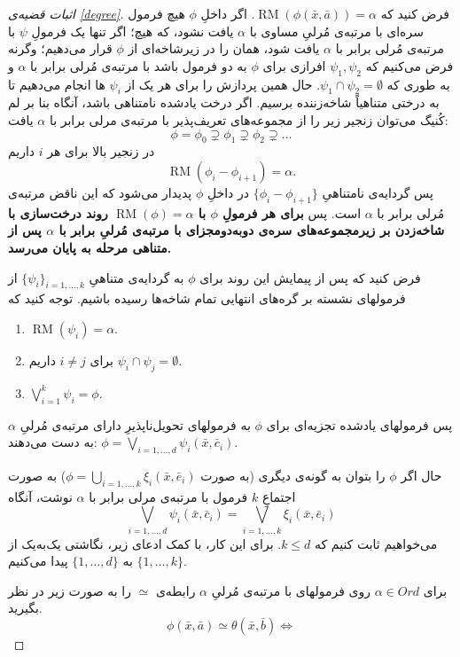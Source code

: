 \documentclass[12pt,a4paper]{report}
\theoremstyle{colorhead}
\DeclareMathOperator{\RM}{RM}
\begin{document}
\begin{proof}[اثبات قضیه‌ی 
\ref{degree}]
	فرض کنید که 
$\RM(\phi(\bar{x},\bar{a}))=\alpha$.
اگر داخلِ
$\phi$
هیچ فرمول سره‌ای با مرتبه‌ی مُرلیِ مساوی با 
$\alpha$
یافت نشود، که هیچ؛ 
اگر تنها یک فرمولِ
$\psi$
با مرتبه‌ی مُرلی برابر با 
$\alpha$
یافت شود، همان را در زیرشاخه‌ای از
$\phi$
قرار می‌دهیم؛ 
وگرنه فرض می‌کنیم که 
$\psi_1,\psi_2$
افرازی برای
$\phi$
به دو فرمول باشد با مرتبه‌ی مُرلی برابر با 
$\alpha$
و به طوری که 
$\psi_1\cap \psi_2=\emptyset$.
حال همین پردازش را برای هر یک از
$\psi_i$
ها انجام می‌دهیم تا به درختی متناهیاً شاخه‌زننده برسیم. اگر درخت یادشده نامتناهی باشد، آنگاه بنا بر
لم کُنیگ می‌توان زنجیر زیر را از مجموعه‌های تعریف‌پذیر با مرتبه‌ی مرلی برابر با
$\alpha$
یافت:
\[
\phi=\phi_0\supsetneq\phi_1\supsetneq  \phi_2\supsetneq\ldots
\]
در زنجیر بالا برای هر $i$
داریم
\[
\RM(\phi_i-\phi_{i+1})=\alpha.
\]
پس گردایه‌ی نامتناهیِ
$\{\phi_i-\phi_{i+1}\}$
در داخلِ
$\phi$
پدیدار می‌شود که این ناقض مرتبه‌ی مُرلی برابر با 
$\alpha$
است. 
پس 
\textbf{برای هر فرمولِ 
$\phi$
با 
$\RM(\phi)=\alpha$
روند درخت‌سازی با شاخه‌زدن بر زیرمجموعه‌های سره‌ی دوبه‌دومجزای با مرتبه‌ی مُرلیِ برابر با
$\alpha$
پس از متناهی مرحله به پایان می‌رسد. 
}
\par 
فرض کنید که 
پس از پیمایش این روند برای 
$\phi$
به گردایه‌ی متناهیِ
$\{\psi_i\}_{i=1,\ldots,k}$
از فرمولهای نشسته بر گره‌های انتهایی تمام شاخه‌ها رسیده باشیم. 
توجه کنید که 
\begin{enumerate}
	\item 
	$\RM(\psi_i)=\alpha$.
	\item 
	برای
	$i\not=j$
	داریم
	$\psi_i\cap \psi_j=\emptyset$.
	\item 
	$\bigvee_{i=1}^k \psi_i=\phi$.
\end{enumerate}
پس فرمولهای یادشده تجزیه‌ای برای 
$\phi$
به فرمولهای تحویل‌ناپذیرِ دارای مرتبه‌ی مُرلیِ 
$\alpha$
به دست می‌دهند: 
$\phi=\bigvee_{i=1,\ldots,d}\psi_i(\bar{x},\bar{c}_i)$.
\par 
حال
اگر
$\phi$
را بتوان به گونه‌ی دیگری 
(به صورت
$\phi=\bigcup_{i=1,\ldots,k}\xi_i(\bar{x},\bar{e}_i)$)
به صورت اجتماعِ
$k$
فرمول با مرتبه‌ی مرلی برابر با
$\alpha$
نوشت، آنگاه
\[
\bigvee_{i=1,\ldots,d} \psi_i(\bar{x},\bar{c}_i)=\bigvee_{i=1,\ldots,k}\xi_i(\bar{x},\bar{e}_i)
\]
می‌خواهیم ثابت کنیم که
$k\leq d$.
برای این کار، با کمک ادعای زیر، نگاشتی یک‌به‌یک از
$\{1,\ldots,k\}$
به
$\{1,\ldots,d\}$
پیدا می‌کنیم.
\par 
برای 
$\alpha\in Ord$
روی فرمولهای با مرتبه‌ی مُرلیِ
$\alpha$
رابطه‌ی
$\simeq$
را به صورت زیر در نظر بگیرید. 
\[
\phi(\bar{x},\bar{a})\simeq \theta(\bar{x},\bar{b})\Leftrightarrow
\]
\end{proof}
\end{document}
